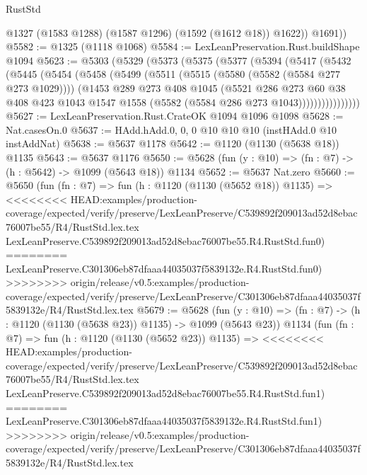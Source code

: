 \begin{lexlean}{RustStd}
\begin{coremodule}
{\begin{coremodule}
{{{{{{{{{{{            @1327
            (@1583 @1288)
            (@1587 @1296)
            (@1592 (@1612 @18))
            @1622))
        @1691))
@5582 := @1325 (@1118 @1068)
@5584 := LexLeanPreservation.Rust.buildShape @1094
@5623 := @5303
    (@5329
      (@5373
        (@5375
          (@5377
            (@5394
              (@5417
                (@5432
                  (@5445
                    (@5454
                      (@5458
                        (@5499
                          (@5511
                            (@5515 (@5580 (@5582 (@5584 @277 @273 @1029))))
                            (@1453
                              @289
                              @273
                              @408
                              @1045
                              (@5521
                                @286
                                @273
                                @60
                                @38
                                @408
                                @423
                                @1043
                                @1547
                                @1558
                                (@5582 (@5584 @286 @273 @1043))))))))))))))))
@5627 := LexLeanPreservation.Rust.CrateOK @1094 @1096 @1098
@5628 := Nat.casesOn.{0}
@5637 := HAdd.hAdd.{0, 0, 0} @10 @10 @10 (instHAdd.{0} @10 instAddNat)
@5638 := @5637 @1178
@5642 := @1120 (@1130 (@5638 @18)) @1135
@5643 := @5637 @1176
@5650 := @5628 (fun (y : @10) => (fn : @7) -> (h : @5642) -> @1099 (@5643 @18)) @1134
@5652 := @5637 Nat.zero
@5660 := @5650
    (fun (fn : @7) =>
    fun (h : @1120 (@1130 (@5652 @18)) @1135) =>
<<<<<<<< HEAD:examples/production-coverage/expected/verify/preserve/LexLeanPreserve/C539892f209013ad52d8ebac76007be55/R4/RustStd.lex.tex
    LexLeanPreserve.C539892f209013ad52d8ebac76007be55.R4.RustStd.fun0)
========
    LexLeanPreserve.C301306eb87dfaaa44035037f5839132e.R4.RustStd.fun0)
>>>>>>>> origin/release/v0.5:examples/production-coverage/expected/verify/preserve/LexLeanPreserve/C301306eb87dfaaa44035037f5839132e/R4/RustStd.lex.tex
@5679 := @5628
    (fun (y : @10) => (fn : @7) -> (h : @1120 (@1130 (@5638 @23)) @1135) -> @1099 (@5643 @23))
    @1134
    (fun (fn : @7) =>
    fun (h : @1120 (@1130 (@5652 @23)) @1135) =>
<<<<<<<< HEAD:examples/production-coverage/expected/verify/preserve/LexLeanPreserve/C539892f209013ad52d8ebac76007be55/R4/RustStd.lex.tex
    LexLeanPreserve.C539892f209013ad52d8ebac76007be55.R4.RustStd.fun1)
========
    LexLeanPreserve.C301306eb87dfaaa44035037f5839132e.R4.RustStd.fun1)
>>>>>>>> origin/release/v0.5:examples/production-coverage/expected/verify/preserve/LexLeanPreserve/C301306eb87dfaaa44035037f5839132e/R4/RustStd.lex.tex
}}}}}}}}}}}
\end{coremodule}}
\end{coremodule}
\end{lexlean}
